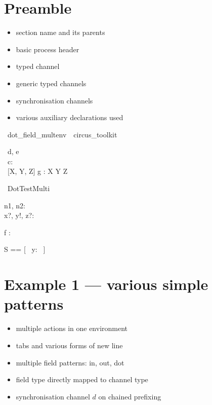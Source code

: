\documentclass{article}
\begin{document}
\section{Preamble}

\begin{itemize}
   \item section name and its parents
   \item basic process header
   \item typed channel
   \item generic typed channels
   \item synchronisation channels
   \item various auxiliary declarations used
\end{itemize}

\begin{zsection}
  \SECTION\ dot\_field\_multenv\ \parents\ circus\_toolkit
\end{zsection}

\begin{circus}
  \circchannel\ d, e \\
   \circchannel\ c: \nat \cross \nat \cross \nat \\
   \circchannel\ [X, Y, Z] g : X \cross Y \cross Z
\end{circus}

\begin{circus}
   \circprocess\ DotTestMulti \circdef \circbegin
\end{circus}

\begin{axdef}
   n1, n2: \nat \\
   x?, y!, z?: \nat
\end{axdef}

\begin{axdef}
   f : \nat \fun \nat \cross \nat
\end{axdef}

\begin{zed}
   S == [~ y: \nat ~]
\end{zed}

\newpage
\section{Example 1 --- various simple patterns}

\begin{itemize}
   \item multiple actions in one environment
   \item tabs and various forms of new line
   \item multiple field patterns: in, out, dot
   \item field type directly mapped to channel type
   \item synchronisation channel $d$ on chained prefixing
\end{itemize}
\end{document}

